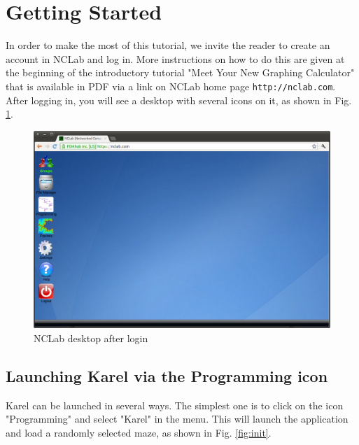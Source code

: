 \documentclass[article,A4,12pt]{llncs}
\begin{document}
\section{Getting Started}

In order to make the most of this tutorial, we invite the 
reader to create an account in NCLab and log in. More instructions 
on how to do this are given at the beginning of the introductory 
tutorial "Meet Your New Graphing Calculator" that is available in 
PDF via a link on NCLab home page {\tt http://nclab.com}.\\

\noindent
After logging in, you will see a desktop with several icons on it,
as shown in Fig. \ref{fig:desktop}. 

\begin{figure}[!ht]
\begin{center}
\includegraphics[width=\textwidth]{img/desktop.png}
\end{center}
\caption{NCLab desktop after login}
\label{fig:desktop}
\end{figure}

\subsection{Launching Karel via the Programming icon}

Karel can be launched in several ways. The simplest one is to click on the icon 
"Programming" and select "Karel" in the menu. This will launch the application 
and load a randomly selected maze, as shown in Fig. \ref{fig:init}.
\end{document}
